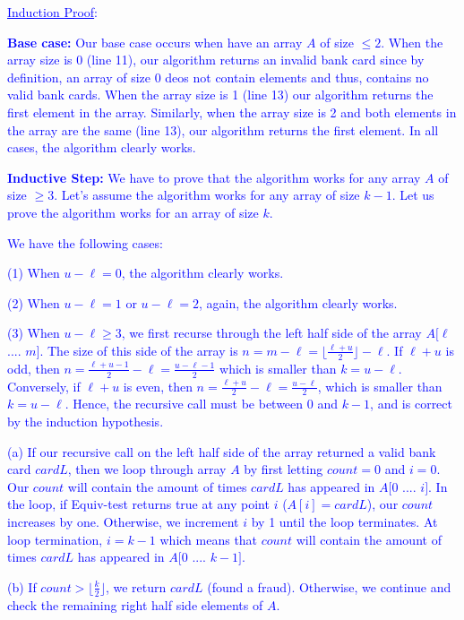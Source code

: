 \documentclass[11pt]{article}
\begin{document}
\begin{itemize}
\textcolor{blue}{ \underline{Induction Proof}:}

\textcolor{blue}{{\bf Base case:} Our base case occurs when have an array $A$ of size $\leq 2$. When the array size is 0 (line 11), our algorithm returns an invalid bank card since by definition, an array of size 0 deos not contain elements and thus, contains no valid bank cards. When the array size is 1 (line 13) our algorithm returns the first element in the array. Similarly, when the array size is 2 and both elements in the array are the same (line 13), our algorithm returns the first element. In all cases, the algorithm clearly works.}

\textcolor{blue}{{\bf Inductive Step:} We have to prove that the algorithm works for any array $A$ of size $\geq 3$. Let's assume the algorithm works for any array of size $k - 1$. Let us prove the algorithm works for an array of size $k$.}

\textcolor{blue}{We have the following cases:}

\textcolor{blue}{(1) When $u - \ell = 0$, the algorithm clearly works.}

\textcolor{blue}{(2) When $u - \ell = 1$ or $u - \ell = 2$, again, the algorithm clearly works.}

\textcolor{blue}{(3) When $u - \ell \geq 3$, we first recurse through the left half side of the array $A[\ell$ .... $m]$. The size of this side of the array is $n = m - \ell = \lfloor \frac{\ell + u}{2} \rfloor - \ell$. If $\ell + u$ is odd, then $n = \frac{\ell + u - 1}{2}- \ell = \frac{u-\ell-1}{2}$ which is smaller than $k=u -\ell$. Conversely, if $\ell + u$ is even, then $n=\frac{\ell + u}{2} - \ell = \frac{u-\ell}{2}$, which is smaller than $k=u-\ell$. Hence, the recursive call must be between $0$ and $k-1$, and is correct by the induction hypothesis.}

\textcolor{blue}{\phantom{(3) } (a) If our recursive call on the left half side of the array returned a valid bank card $cardL$, then we loop through array $A$ by first letting $count = 0$ and $i = 0$. Our $count$ will contain the amount of times $cardL$ has appeared in $A[0$ .... $i]$. In the loop, if Equiv-test returns true at any point $i$ ($A[i] = cardL$), our $count$ increases by one. Otherwise, we increment $i$ by 1 until the loop terminates. At loop termination, $i = k-1$ which means that $count$ will contain the amount of times $cardL$ has appeared in $A[0$ .... $k - 1]$.}

\textcolor{blue}{\phantom{(3) } (b) If $count > \lfloor \frac{k}{2} \rfloor$, we return $cardL$ (found a fraud). Otherwise, we continue and check the remaining right half side elements of $A$.}


\end{itemize}
\end{document}
